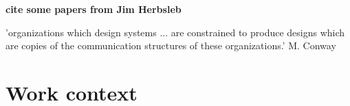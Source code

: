 \documentclass[12pt, letterpaper]{article}
\newcommand{\todo}[1]
  {{\scriptsize \textbf{\color{red} {#1}}}}
\begin{document}
\cite{monperrus11} 

\cite{Newell06} 

\cite{Steinmacher12} 

\cite{Dagenais10} 

\cite{Razavi06} 

\cite{Whitworth06} 

\todo{cite some papers from Jim Herbsleb}


'organizations which design systems ... are constrained to produce designs which are copies of the communication structures of these organizations.' M. Conway
 
 


 
\section{Work context}
\end{document}
